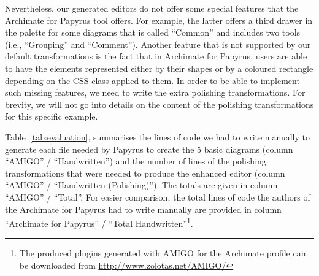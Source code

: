 Nevertheless, our generated editors do 
not offer some special features that the Archimate for Papyrus tool offers. For 
example, the latter offers a third drawer in the palette for some diagrams that 
is called ``Common'' and includes two tools (i.e., ``Grouping'' and 
``Comment''). Another feature that is not supported by our default 
transformations is the fact that in Archimate for Papyrus, users are able to 
have the elements represented either by their shapes or by a coloured rectangle 
depending on the CSS class applied to them. In order to be able to implement 
such missing features, we need to write the extra polishing transformations. 
For brevity, we will not go into details on the content of the polishing 
transformations for this specific example.

Table~\ref{tab:evaluation}, summarises the lines of code we had to write manually
to generate each file needed by Papyrus to create the 5 basic diagrams (column
``AMIGO'' / ``Handwritten'') and the number of lines of the polishing
transformations that were needed to produce the enhanced editor (column ``AMIGO'' 
/ ``Handwritten (Polishing)''). The totals are given in column ``AMIGO'' / 
``Total''. For easier comparison, the total lines of code the authors of the 
Archimate for Papyrus had to write manually are provided in column ``Archimate 
for Papyrus'' / ``Total Handwritten''\footnote{The produced plugins generated 
    with AMIGO for the Archimate profile can be downloaded from \url{http://www.zolotas.net/AMIGO/}}.

